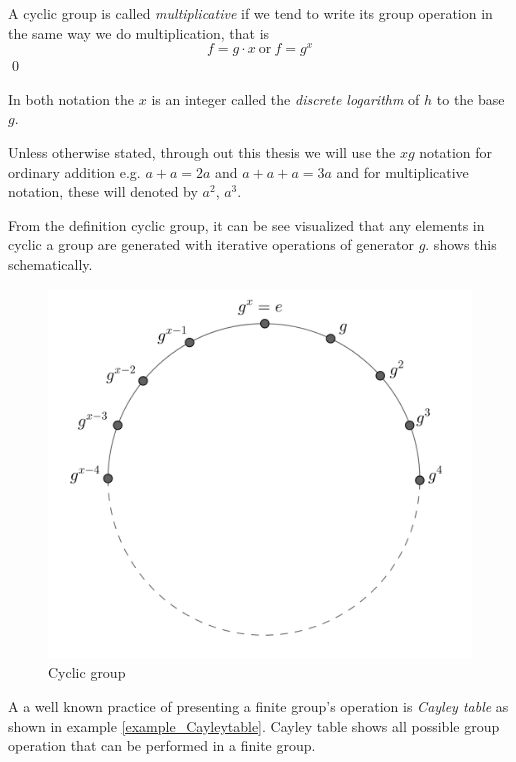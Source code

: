 \begin{definition}
	A cyclic group is called \textit{multiplicative} if we tend to write its group operation in the same way we do multiplication, that is 
	$$f =  g \cdot x ~\text{or}~ f = g^x$$ 
	\qed
\end{definition}

\begin{remark}
	In both notation the $x$  is an integer called the \textit{discrete logarithm} of $h$ to the base $g$.
\end{remark}
\begin{remark}
	Unless otherwise stated, through out this thesis we will use the $xg$ notation for ordinary addition e.g. $a+a=2a$ and $a+a+a=3a$ and for multiplicative notation, these will denoted by $a^2$, $a^3$.
\end{remark}

From the definition cyclic group, it can be see visualized that any elements in cyclic a group are generated with iterative operations of generator $g$. 
 shows this schematically.
\begin{figure}[ht]
\begin{center}
	\includegraphics[width=.6\linewidth, height=.67\textheight, keepaspectratio]{Figures/cyclicgroup}
\caption{Cyclic group}
\label{Cyclic group}
\end{center}
\end{figure}

A a well known practice of presenting a finite group's operation is {\em Cayley table} as shown in example \ref{example_Cayleytable}.
Cayley table shows all possible group operation that can be performed in a finite group.

